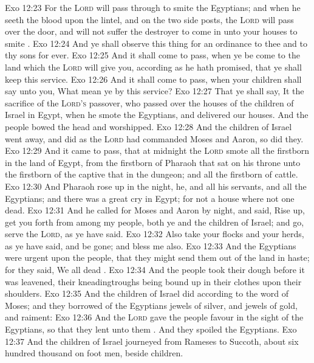 \vs Exo 12:23 For the \textsc{Lord} will pass through to smite the Egyptians; and when he seeth the blood upon the lintel, and on the two side posts, the \textsc{Lord} will pass over the door, and will not suffer the destroyer to come in unto your houses to smite .
\vs Exo 12:24 And ye shall observe this thing for an ordinance to thee and to thy sons for ever.
\vs Exo 12:25 And it shall come to pass, when ye be come to the land which the \textsc{Lord} will give you, according as he hath promised, that ye shall keep this service.
\vs Exo 12:26 And it shall come to pass, when your children shall say unto you, What mean ye by this service?
\vs Exo 12:27 That ye shall say, It  the sacrifice of the \textsc{Lord's} passover, who passed over the houses of the children of Israel in Egypt, when he smote the Egyptians, and delivered our houses. And the people bowed the head and worshipped.
\vs Exo 12:28 And the children of Israel went away, and did as the \textsc{Lord} had commanded Moses and Aaron, so did they.
\vs Exo 12:29 And it came to pass, that at midnight the \textsc{Lord} smote all the firstborn in the land of Egypt, from the firstborn of Pharaoh that sat on his throne unto the firstborn of the captive that  in the dungeon; and all the firstborn of cattle.
\vs Exo 12:30 And Pharaoh rose up in the night, he, and all his servants, and all the Egyptians; and there was a great cry in Egypt; for  not a house where  not one dead.
\vs Exo 12:31 And he called for Moses and Aaron by night, and said, Rise up,  get you forth from among my people, both ye and the children of Israel; and go, serve the \textsc{Lord}, as ye have said.
\vs Exo 12:32 Also take your flocks and your herds, as ye have said, and be gone; and bless me also.
\vs Exo 12:33 And the Egyptians were urgent upon the people, that they might send them out of the land in haste; for they said, We  all dead .
\vs Exo 12:34 And the people took their dough before it was leavened, their kneadingtroughs being bound up in their clothes upon their shoulders.
\vs Exo 12:35 And the children of Israel did according to the word of Moses; and they borrowed of the Egyptians jewels of silver, and jewels of gold, and raiment:
\vs Exo 12:36 And the \textsc{Lord} gave the people favour in the sight of the Egyptians, so that they lent unto them . And they spoiled the Egyptians.
\vs Exo 12:37 And the children of Israel journeyed from Rameses to Succoth, about six hundred thousand on foot  men, beside children.
